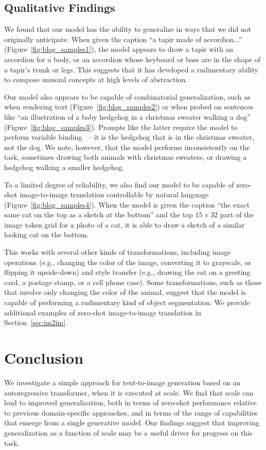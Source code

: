 \subsection{Qualitative Findings}
\label{sec:qual_findings}

We found that our model has the ability to generalize in ways that we did not originally anticipate. When given the caption ``a tapir made of accordion...'' (Figure~\ref{fig:blog_samples1}), the model appears to draw a tapir with an accordion for a body, or an accordion whose keyboard or bass are in the shape of a tapir's trunk or legs. This suggests that it has developed a rudimentary ability to compose unusual concepts at high levels of abstraction.

Our model also appears to be capable of combinatorial generalization, such as when rendering text (Figure~\ref{fig:blog_samples2}) or when probed on sentences like ``an illustration of a baby hedgehog in a christmas sweater walking a dog'' (Figure~\ref{fig:blog_samples3}). Prompts like the latter require the model to perform variable binding~\cite{smolensky1990tensor,greff2020binding} -- it is the hedgehog that is in the christmas sweater, not the dog. We note, however, that the model performs inconsistently on the task, sometimes drawing both animals with christmas sweaters, or drawing a hedgehog walking a smaller hedgehog.

To a limited degree of reliability, we also find our model to be capable of zero-shot image-to-image translation controllable by natural language (Figure~\ref{fig:blog_samples4}). When the model is given the caption ``the exact same cat on the top as a sketch at the bottom'' and the top $15 \times 32$ part of the image token grid for a photo of a cat, it is able to draw a sketch of a similar looking cat on the bottom. 

This works with several other kinds of transformations, including image operations (e.g., changing the color of the image, converting it to grayscale, or flipping it upside-down) and style transfer (e.g., drawing the cat on a greeting card, a postage stamp, or a cell phone case). Some transformations, such as those that involve only changing the color of the animal, suggest that the model is capable of performing a rudimentary kind of object segmentation. We provide additional examples of zero-shot image-to-image translation in Section~\ref{sec:im2im}.

\section{Conclusion}

We investigate a simple approach for text-to-image generation based on an autoregressive transformer, when it is executed at scale. We find that scale can lead to improved generalization, both in terms of zero-shot performance relative to previous domain-specific approaches, and in terms of the range of capabilities that emerge from a single generative model. Our findings suggest that improving generalization as a function of scale may be a useful driver for progress on this task.


